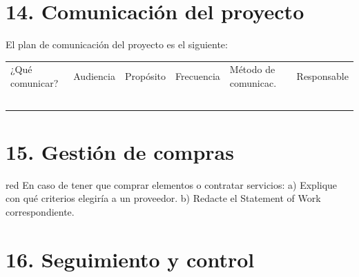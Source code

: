 \documentclass[11pt]{charter}
\begin{document}

\clearpage

\section{14. Comunicación del proyecto}
\label{sec:comunicaciones}

El plan de comunicación del proyecto es el siguiente:

\begin{table}[htpb]
\centering
\begin{tabularx}{\linewidth}{@{}|X|C{2.4cm}|C{3cm}|C{1.8cm}|C{2cm}|C{2.1cm}|@{}}
\hline
{} 
           \\ \hline
{} 
¿Qué comunicar? & Audiencia & Propósito & Frecuencia & Método de comunicac. & Responsable \\ \hline
                &           &           &            &                      &             \\ \hline
                &           &           &            &                      &             \\ \hline
                &           &           &            &                      &             \\ \hline
                &           &           &            &                      &             \\ \hline
                &           &           &            &                      &             \\ \hline
\end{tabularx}
\end{table}

\section{15. Gestión de compras}
\label{sec:compras}

\begin{consigna}{red}
En caso de tener que comprar elementos o contratar servicios:
a) Explique con qué criterios elegiría a un proveedor.
b) Redacte el Statement of Work correspondiente.
\end{consigna}

\section{16. Seguimiento y control}
\label{sec:seguimiento}
\end{document}
